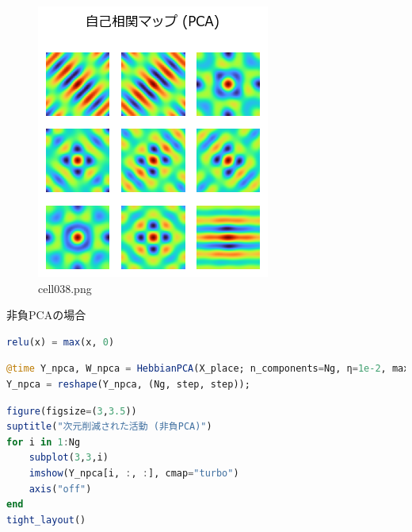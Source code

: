 \begin{figure}[ht]
	\centering
	\includegraphics[scale=0.8, max width=\linewidth]{./fig/local-learning-rule/pca-hebbian-learning/cell038.png}
	\caption{cell038.png}
	\label{cell038.png}
\end{figure}
非負PCAの場合
\begin{lstlisting}[language=julia]
relu(x) = max(x, 0)
\end{lstlisting}
\begin{lstlisting}[language=julia]
@time Y_npca, W_npca = HebbianPCA(X_place; n_components=Ng, η=1e-2, maxiter=5000, func=relu, orthogonal=true);
Y_npca = reshape(Y_npca, (Ng, step, step));
\end{lstlisting}
\begin{lstlisting}[language=julia]
figure(figsize=(3,3.5))
suptitle("次元削減された活動 (非負PCA)")
for i in 1:Ng
    subplot(3,3,i)
    imshow(Y_npca[i, :, :], cmap="turbo")
    axis("off")
end
tight_layout()
\end{lstlisting}
